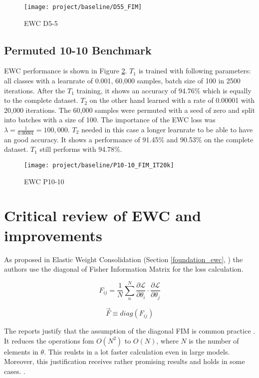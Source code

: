 \begin{figure}[H]
    \centering
    \texttt{[image: project/baseline/D55\_FIM]}
    \caption{EWC D5-5}
    \label{fig:ewc_d5-5}
\end{figure}

\subsection{Permuted 10-10 Benchmark}

EWC performance is shown in Figure \ref{fig:ewc_p10-10}.
$T_1$ is trained with following parameters:
all classes with a
learnrate of 0.001,
60,000 samples,
batch size of 100 in
2500 iterations.
After the $T_1$ training, it shows an accuracy of 94.76\% which is equally to the complete dataset.
\newline
$T_2$ on the other hand learned with a rate of 0.00001 with 20,000 iterations.
The 60,000 samples were permuted with a seed of zero and split into batches with a size of 100.
The importance of the EWC loss was $\lambda = \frac{1}{0.00001} = 100,000$.
$T_2$ needed in this case a longer learnrate to be able to have an good accuracy.
It shows a performance of 91.45\% and 90.53\% on the complete dataset.
$T_1$ still performs with 94.78\%.

\begin{figure}[H]
    \centering
    \texttt{[image: project/baseline/P10-10\_FIM\_IT20k]}
    \caption{EWC P10-10}
    \label{fig:ewc_p10-10}
\end{figure}

\section{Critical review of EWC and improvements}
\label{project_review_improvements}

As proposed in Elastic Weight Consolidation (Section \ref{foundation_ewc}, \cite{elastic-weight-consolidation}) the authors use the diagonal of Fisher Information Matrix for the loss calculation.

$$F_{ij} = \frac{1}{N} \sum_{n}^{N} \frac{\partial \mathcal{L}}{\partial \theta_{i}} \cdot \frac{\partial \mathcal{L}}{\partial \theta_{j}}$$

$$\vec{F} \equiv diag \left(F_{ij}\right)$$

The reports \cite{better-weight-consolidation,elastic-weight-consolidation} justify that the assumption of the diagonal FIM is common practice \cite{elastic-weight-consolidation,better-weight-consolidation,incremental-moment-matching}.
It reduces the operations fom $O(N^2)$ to $O(N)$, where $N$ is the number of elements in $\theta$.
This reulsts in a lot faster calculation even in large models.
\cite{elastic-weight-consolidation,better-weight-consolidation}
Moreover, this justification receives rather promising results and holds in some cases.
\cite{elastic-weight-consolidation,incremental-moment-matching}.

